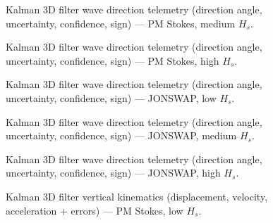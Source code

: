 \documentclass[11pt,letterpaper]{article}
\begin{document}
    \begin{figure}[H]\centering
    \resizebox{\textwidth}{!}{}
    \caption{Kalman 3D filter wave direction telemetry (direction angle, uncertainty, confidence, sign) — PM Stokes, medium $H_s$.}
    \label{fig:w3d_ou3_pmstokes_medium_dir}
    \end{figure}

    \begin{figure}[H]\centering
    \resizebox{\textwidth}{!}{}
    \caption{Kalman 3D filter wave direction telemetry (direction angle, uncertainty, confidence, sign) — PM Stokes, high $H_s$.}
    \label{fig:w3d_ou3_pmstokes_high_dir}
    \end{figure}

    \begin{figure}[H]\centering
    \resizebox{\textwidth}{!}{}
    \caption{Kalman 3D filter wave direction telemetry (direction angle, uncertainty, confidence, sign) — JONSWAP, low $H_s$.}
    \label{fig:w3d_ou3_jonswap_low_dir}
    \end{figure}

    \begin{figure}[H]\centering
    \resizebox{\textwidth}{!}{}
    \caption{Kalman 3D filter wave direction telemetry (direction angle, uncertainty, confidence, sign) — JONSWAP, medium $H_s$.}
    \label{fig:w3d_ou3_jonswap_medium_dir}
    \end{figure}

    \begin{figure}[H]\centering
    \resizebox{\textwidth}{!}{}
    \caption{Kalman 3D filter wave direction telemetry (direction angle, uncertainty, confidence, sign) — JONSWAP, high $H_s$.}
    \label{fig:w3d_ou3_jonswap_high_dir}
    \end{figure}




    \begin{figure}[H]\centering
    \resizebox{\textwidth}{!}{}
    \caption{Kalman 3D filter vertical kinematics (displacement, velocity, acceleration + errors) — PM Stokes, low $H_s$.}
    \label{fig:w3d_ou3_pmstokes_low_zkin}
    \end{figure}
\end{document}
